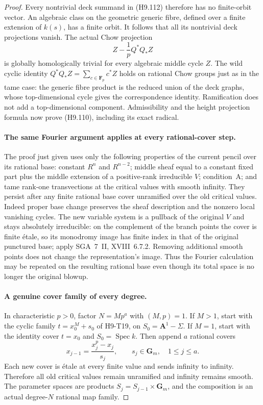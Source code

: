 \begin{proof}
Every nontrivial deck summand in (H9.112) therefore has
no finite-orbit vector. An algebraic class on the
geometric generic fibre, defined over a finite extension
of $k(s)$, has a finite orbit. It follows that all its
nontrivial deck projections vanish. The actual Chow
projection
\[
                  Z-\frac1p Q^*Q_*Z
\]
is globally homologically trivial for every algebraic
middle cycle $Z$. The wild cyclic identity
$Q^*Q_*Z=\sum_{c\in\mathbf F_p}c^*Z$ holds on rational
Chow groups just as in the tame case: the generic fibre
product is the reduced union of the deck graphs, whose
top-dimensional cycle gives the correspondence identity.
Ramification does not add a top-dimensional component.
Admissibility and the height projection formula now
prove (H9.110), including its exact radical.

\paragraph{The same Fourier argument applies at every rational-cover step.}
The proof just given uses only the following properties
of the current pencil over its rational base: constant
$R^n$ and $R^{n-2}$; middle sheaf equal to a constant
fixed part plus the middle extension of a positive-rank
irreducible $V$; condition~A; and tame rank-one
transvections at the critical values with smooth infinity.
They persist after any finite rational base cover
unramified over the old critical values. Indeed proper
base change preserves the sheaf description and the
nonzero local vanishing cycles. The new variable system
is a pullback of the original $V$ and stays absolutely
irreducible: on the complement of the branch points the
cover is finite \'etale, so its monodromy image has finite
index in that of the original punctured base; apply
SGA~7~II, XVIII~6.7.2. Removing additional smooth points
does not change the representation's image. Thus the
Fourier calculation may be repeated on the resulting
rational base even though its total space is no longer
the original blowup.

\paragraph{A genuine cover family of every degree.}
In characteristic $p>0$, factor
$N=M p^a$ with $(M,p)=1$. If $M>1$, start with the
cyclic family $t=x_0^M+s_0$ of H9-T19, on
$S_0=\mathbf A^1-\Sigma$. If $M=1$, start with the
identity cover $t=x_0$ and $S_0=\operatorname{Spec}k$.
Then append $a$ rational covers
\[
              x_{j-1}=\frac{x_j^p-x_j}{s_j},
                \qquad s_j\in\mathbf G_m,\quad 1\le j\le a.
                                                               \tag{H9.114}
\]
Each new cover is \'etale at every finite value
and sends infinity to infinity. Therefore all old
critical values remain unramified and infinity remains
smooth. The parameter spaces are products
$S_j=S_{j-1}\times\mathbf G_m$, and the composition is
an actual degree-$N$ rational map family.


\end{proof}
